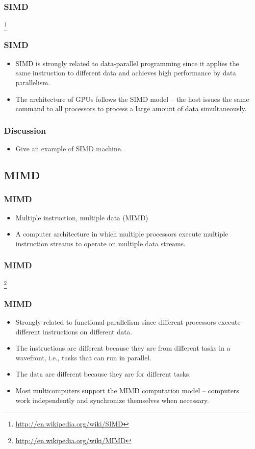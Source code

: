 \documentclass{beamer}
\begin{document}
\begin{CJK}{UTF8}{bsmi}
\begin{frame}
\frametitle{SIMD}
\centerline{}
\footnote{\url{http://en.wikipedia.org/wiki/SIMD}}
\end{frame}

\begin{frame}
\frametitle{SIMD}
\begin{itemize}
\item SIMD is strongly related to data-parallel programming since it applies the same instruction to different data and achieves high performance by data parallelism.
\item The architecture of GPUs follows the SIMD model -- the host issues the same command to all processors to process a large amount of data simultaneously.
\end{itemize}
\end{frame}

\begin{frame}
\frametitle{Discussion}
\begin{itemize}
\item Give an example of SIMD machine.
\end{itemize}
\end{frame}


\subsection{MIMD}

\begin{frame}
\frametitle{MIMD}
\begin{itemize}
\item Multiple instruction, multiple data (MIMD) 
\item A computer architecture in which multiple processors execute
  multiple instruction streams to operate on multiple data streams.
\end{itemize}
\end{frame}

\begin{frame}
\frametitle{MIMD}
\centerline{}
\footnote{\url{http://en.wikipedia.org/wiki/MIMD}}
\end{frame}

\begin{frame}
\frametitle{MIMD}
\begin{itemize}
\item Strongly related to functional parallelism since different
  processors execute different instructions on different data.
\item The instructions are different because they are from different
  tasks in a wavefront, i.e., tasks that can run in parallel.
\item The data are different because they are for different tasks.
\item Most multicomputers support the MIMD computation model -- computers work independently and synchronize themselves when necessary.
\end{itemize}
\end{frame}


\end{CJK}
\end{document}
